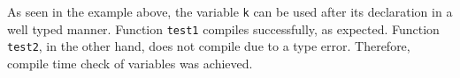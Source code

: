 As seen in the example above, the variable \texttt{k} can be used after its declaration in a well typed manner. Function \texttt{test1} compiles successfully, as expected. Function \texttt{test2}, in the other hand, does not compile due to a type error. Therefore, compile time check of variables was achieved.

